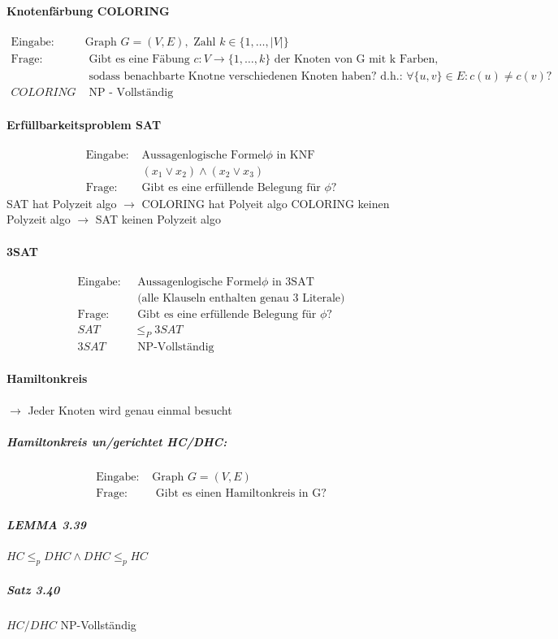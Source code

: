 \documentclass[a4paper, 10pt]{article}
\theoremstyle{definition}
\begin{document}
\paragraph{Knotenfärbung COLORING}
\begin{align*}
    \text{Eingabe: }& \text{Graph }G=(V,E), \text{ Zahl }k\in\{1,\dots,|V|\}\\
    \text{Frage: }& \text{ Gibt es eine Fäbung }c:V\to\{1,\dots,k\} \text{ der Knoten von G mit k Farben,}\\&\text{ sodass benachbarte Knotne verschiedenen Knoten haben? d.h.: }\forall\{u,v\}\in E:c(u)\neq c(v)?\\
    COLORING & \text{ NP - Vollständig}
\end{align*}
\paragraph{ Erfüllbarkeitsproblem SAT}
\begin{align*}
    \text{Eingabe: }&\text{Aussagenlogische Formel}\phi \text{ in KNF}\\
    &(x_1\lor x_2)\land (x_2\lor x_3)\\
    \text{Frage: }&\text{Gibt es eine erfüllende Belegung für }\phi?
\end{align*}
SAT hat Polyzeit algo $\to$ COLORING hat Polyeit algo
COLORING keinen Polyzeit algo $\to$ SAT keinen Polyzeit algo
\paragraph{3SAT}\begin{align*}
    \text{Eingabe: }&\text{ Aussagenlogische Formel$\phi$ in 3SAT}\\
    &\text{ (alle Klauseln enthalten genau 3 Literale)}\\
    \text{Frage: }&\text{ Gibt es eine erfüllende Belegung für $\phi$?}\\
    SAT&\leq_P 3SAT\\
    3SAT & \text{ NP-Vollständig}
\end{align*}\paragraph{Hamiltonkreis}
$\to$ Jeder Knoten wird genau einmal besucht\\
\subparagraph{Hamiltonkreis un/gerichtet HC/DHC:}
\begin{align*}
    \text{Eingabe: }&\text{Graph }G=(V,E)\\
    \text{Frage: }&\text{ Gibt es einen Hamiltonkreis in G?}
\end{align*}
\subparagraph{LEMMA 3.39}$HC\leq_p DHC \land DHC\leq_p HC$
\subparagraph{Satz 3.40}$HC/DHC$ NP-Vollständig
\end{document}

